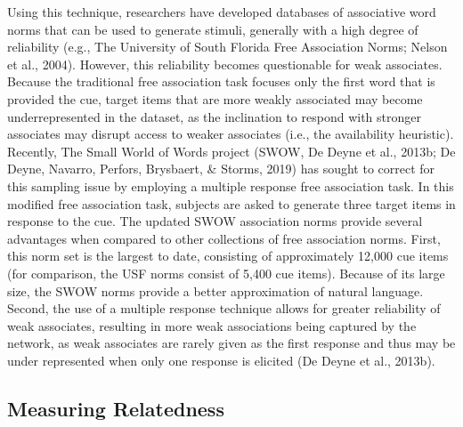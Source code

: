 \documentclass[english,,man]{apa6}
\begin{document}
Using this technique, researchers have developed databases of associative word norms that can be used to generate stimuli, generally with a high degree of reliability (e.g., The University of South Florida Free Association Norms; Nelson et al., 2004). However, this reliability becomes questionable for weak associates. Because the traditional free association task focuses only the first word that is provided the cue, target items that are more weakly associated may become underrepresented in the dataset, as the inclination to respond with stronger associates may disrupt access to weaker associates (i.e., the availability heuristic). Recently, The Small World of Words project (SWOW, De Deyne et al., 2013b; De Deyne, Navarro, Perfors, Brysbaert, \& Storms, 2019) has sought to correct for this sampling issue by employing a multiple response free association task. In this modified free association task, subjects are asked to generate three target items in response to the cue. The updated SWOW association norms provide several advantages when compared to other collections of free association norms. First, this norm set is the largest to date, consisting of approximately 12,000 cue items (for comparison, the USF norms consist of 5,400 cue items). Because of its large size, the SWOW norms provide a better approximation of natural language. Second, the use of a multiple response technique allows for greater reliability of weak associates, resulting in more weak associations being captured by the network, as weak associates are rarely given as the first response and thus may be under represented when only one response is elicited (De Deyne et al., 2013b).

\hypertarget{measuring-relatedness}{%
\subsection{Measuring Relatedness}\label{measuring-relatedness}}
\end{document}
